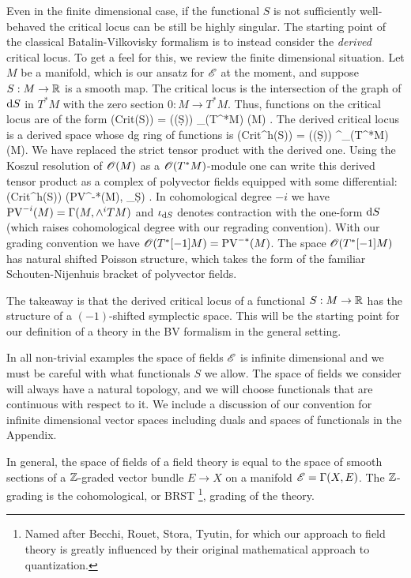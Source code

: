 \documentclass[10pt]{amsart}
\begin{document}
Even in the finite dimensional case, if the functional $S$ is not sufficiently well-behaved the critical locus can be still be highly singular. 
The starting point of the classical Batalin-Vilkovisky formalism is to instead consider the {\em derived} critical locus.
To get a feel for this, we review the finite dimensional situation.
Let $M$ be a manifold, which is our ansatz for $\mathscr E$ at the moment, and suppose $S : M \to \mathbb R$ is a smooth map.
The critical locus is the intersection of the graph of ${\rm d} S$ in $T^*M$ with the zero section $0 : M \to T^*M$.
Thus, functions on the critical locus are of the form
\ben
\sO({\rm Crit}(S)) = \sO(\Gamma(\d S)) \tensor_{\sO(T^*M)} \sO(M) .
\een
The derived critical locus is a derived space whose dg ring of functions is 
\ben
\sO({\rm Crit}^{h}(S)) = \sO(\Gamma(\d S)) \tensor^{\LL}_{\sO(T^*M)} \sO(M).
\een
We have replaced the strict tensor product with the derived one.
Using the Koszul resolution of $\mathscr O(M)$ as a $\mathscr O(T^*M)$-module one can write this derived tensor product as a complex of polyvector fields equipped with some differential:
\ben
\sO({\rm Crit}^h(S)) \simeq \left({\rm PV}^{-*}(M), \iota_{\d S}\right) .
\een
In cohomological degree $-i$ we have ${\rm PV}^{-i} (M) = \Gamma(M, \wedge^i TM)$ and $\iota_{{\rm d} S}$ denotes contraction with the one-form ${\rm d} S$ (which raises cohomological degree with our regrading convention).
With our grading convention we have $\mathscr O(T^*[-1] M) = {\rm PV}^{-*}(M)$. 
The space $\mathscr O(T^*[-1]M)$ has natural shifted Poisson structure, which takes the form of the familiar Schouten-Nijenhuis bracket of polyvector fields.

The takeaway is that the derived critical locus of a functional $S : M \to \mathbb R$ has the structure of a $(-1)$-shifted symplectic space.
This will be the starting point for our definition of a theory in the BV formalism in the general setting.
 
In all non-trivial examples the space of fields $\mathscr E$ is infinite dimensional and we must be careful with what functionals $S$ we allow.
The space of fields we consider will always have a natural topology, and we will choose functionals that are continuous with respect to it. 
We include a discussion of our convention for infinite dimensional vector spaces including duals and spaces of functionals in the Appendix. 

In general, the space of fields of a field theory is equal to the space of smooth sections of a $\mathbb Z$-graded vector bundle $E \to X$ on a manifold $\mathscr E = \Gamma(X, E)$. 
The $\mathbb Z$-grading is the cohomological, or BRST \footnote{Named after Becchi, Rouet, Stora, Tyutin, for which our approach to field theory is greatly influenced by their original mathematical approach to quantization.}, grading of the theory.
\end{document}
